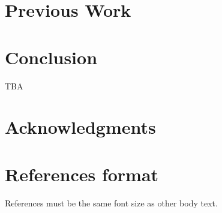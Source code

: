 \documentclass{sigchi}
\begin{document}
\section{Previous Work}

\section{Conclusion}

TBA

\section{Acknowledgments}
\section{References format}
References must be the same font size as other body text.



\end{document}
